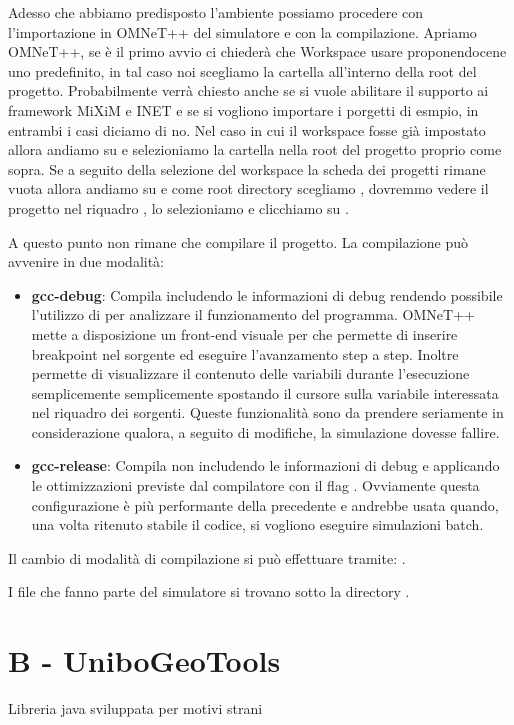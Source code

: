 Adesso che abbiamo predisposto l'ambiente possiamo procedere con l'importazione in OMNeT++ del simulatore e con la compilazione. Apriamo OMNeT++, se è il primo avvio ci chiederà che Workspace usare proponendocene uno predefinito, in tal caso noi scegliamo la cartella  all'interno della root del progetto. Probabilmente verrà chiesto anche se si vuole abilitare il supporto ai framework MiXiM e INET e se si vogliono importare i porgetti di esmpio, in entrambi i casi diciamo di no. Nel caso in cui il workspace fosse già impostato allora andiamo su  e selezioniamo la cartella  nella root del progetto proprio come sopra. Se a seguito della selezione del workspace  la scheda dei progetti rimane vuota allora andiamo su  e come root directory scegliamo , dovremmo vedere il progetto  nel riquadro , lo selezioniamo e clicchiamo su .

A questo punto non rimane che compilare il progetto. La compilazione può avvenire in due modalità:

\begin{itemize}
	\item \textbf{gcc-debug}: Compila includendo le informazioni di debug rendendo possibile l'utilizzo di  per analizzare il funzionamento del programma. OMNeT++ mette a disposizione un front-end visuale per  che permette di inserire breakpoint nel sorgente ed eseguire l'avanzamento step a step. Inoltre permette di visualizzare il contenuto delle variabili durante l'esecuzione semplicemente semplicemente spostando il cursore sulla variabile interessata nel riquadro dei sorgenti. Queste funzionalità sono da prendere seriamente in considerazione qualora, a seguito di modifiche, la simulazione dovesse fallire.
	\item \textbf{gcc-release}: Compila non includendo le informazioni di debug e applicando le ottimizzazioni previste dal compilatore  con il flag . Ovviamente questa configurazione è più performante della precedente e andrebbe usata quando, una volta ritenuto stabile il codice, si vogliono eseguire simulazioni batch.
\end{itemize}

Il cambio di modalità di compilazione si può effettuare tramite: .

I file che fanno parte del simulatore si trovano sotto la directory . 


\section{B - UniboGeoTools}

Libreria java sviluppata per motivi strani
